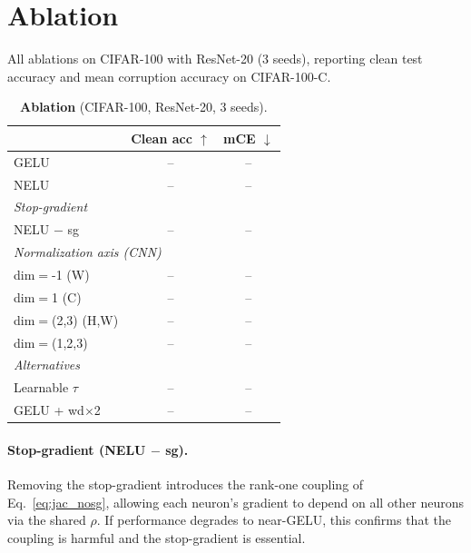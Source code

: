 \section{Ablation}\label{app:ablation}

All ablations on CIFAR-100 with ResNet-20 (3 seeds), reporting clean test accuracy and mean corruption accuracy on CIFAR-100-C.

\begin{table}[h]
\centering
\caption{\textbf{Ablation} (CIFAR-100, ResNet-20, 3 seeds).}
\label{tab:ablation}
\vspace{0.5em}
\small
\begin{tabular}{lcc}
\toprule
                        & Clean acc $\uparrow$ & mCE $\downarrow$ \\
\midrule
GELU                    & -- & -- \\
NELU                    & -- & -- \\
\midrule
\multicolumn{3}{l}{\textit{Stop-gradient}} \\
\quad NELU $-$ sg       & -- & -- \\
\midrule
\multicolumn{3}{l}{\textit{Normalization axis (CNN)}} \\
\quad dim$=$-1 (W)      & -- & -- \\
\quad dim$=$1 (C)       & -- & -- \\
\quad dim$=$(2,3) (H,W) & -- & -- \\
\quad dim$=$(1,2,3)     & -- & -- \\
\midrule
\multicolumn{3}{l}{\textit{Alternatives}} \\
\quad Learnable $\tau$  & -- & -- \\
\quad GELU + wd$\times$2 & -- & -- \\
\bottomrule
\end{tabular}
\end{table}

\paragraph{Stop-gradient (NELU $-$ sg).}
Removing the stop-gradient introduces the rank-one coupling of Eq.~\ref{eq:jac_nosg}, allowing each neuron's gradient to depend on all other neurons via the shared $\rho$.
If performance degrades to near-GELU, this confirms that the coupling is harmful and the stop-gradient is essential.

